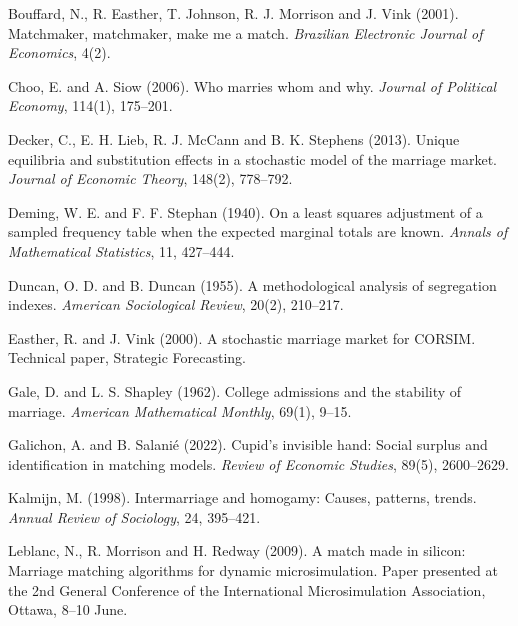 \documentclass[12pt,a4paper]{article}
\begin{document}
\begin{list}{}{\setlength{\leftmargin}{1.5em}\setlength{\itemindent}{-1.5em}\setlength{\itemsep}{3pt}\setlength{\parsep}{0pt}\small}

\item Bouffard, N., R. Easther, T. Johnson, R. J. Morrison and J. Vink (2001). Matchmaker,
matchmaker, make me a match. \emph{Brazilian Electronic Journal of Economics}, 4(2).

\item Choo, E. and A. Siow (2006). Who marries whom and why. \emph{Journal of Political Economy},
114(1), 175--201.

\item Decker, C., E. H. Lieb, R. J. McCann and B. K. Stephens (2013). Unique equilibria and
substitution effects in a stochastic model of the marriage market. \emph{Journal of Economic
Theory}, 148(2), 778--792.

\item Deming, W. E. and F. F. Stephan (1940). On a least squares adjustment of a sampled
frequency table when the expected marginal totals are known. \emph{Annals of Mathematical
Statistics}, 11, 427--444.

\item Duncan, O. D. and B. Duncan (1955). A methodological analysis of segregation indexes.
\emph{American Sociological Review}, 20(2), 210--217.

\item Easther, R. and J. Vink (2000). A stochastic marriage market for CORSIM. Technical paper,
Strategic Forecasting.

\item Gale, D. and L. S. Shapley (1962). College admissions and the stability of marriage.
\emph{American Mathematical Monthly}, 69(1), 9--15.

\item Galichon, A. and B. Salanié (2022). Cupid's invisible hand: Social surplus and
identification in matching models. \emph{Review of Economic Studies}, 89(5), 2600--2629.

\item Kalmijn, M. (1998). Intermarriage and homogamy: Causes, patterns, trends. \emph{Annual
Review of Sociology}, 24, 395--421.

\item Leblanc, N., R. Morrison and H. Redway (2009). A match made in silicon: Marriage matching
algorithms for dynamic microsimulation. Paper presented at the 2nd General Conference of the
International Microsimulation Association, Ottawa, 8--10 June.


\end{list}
\end{document}
